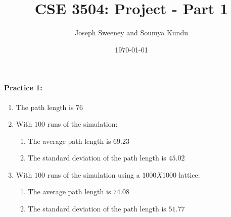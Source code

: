 \documentclass[12pt]{article}
\title{CSE 3504: Project - Part 1}
\author{Joseph Sweeney and Soumya Kundu}
\date{\today}
\begin{document}
\maketitle
\vspace{-0.3in}

\paragraph{Practice 1:}
	\begin{enumerate}
	\item The path length is $76$
	\item With $100$ runs of the simulation:
		\begin{enumerate}
		\item The average path length is $69.23$
        \item The standard deviation of the path length is $45.02$
        \end{enumerate}
	\item With $100$ runs of the simulation using a $1000 X 1000$ lattice:
    	\begin{enumerate}
		\item The average path length is $74.08$
    	\item The standard deviation of the path length is $51.77$
        \end{enumerate}
	\end{enumerate}

\smallskip
\end{document}
